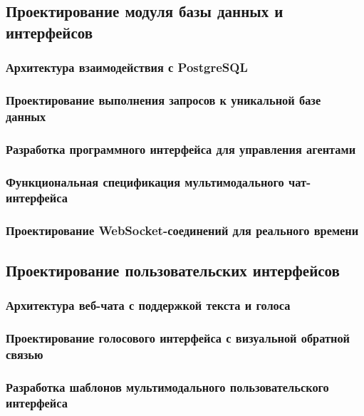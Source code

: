 \documentclass{syksu-coursework}
\begin{document}
\subsection{Проектирование модуля базы данных и интерфейсов}

\subsubsection{Архитектура взаимодействия с PostgreSQL}

\subsubsection{Проектирование выполнения запросов к уникальной базе данных}

\subsubsection{Разработка программного интерфейса для управления агентами}

\subsubsection{Функциональная спецификация мультимодального чат-интерфейса}

\subsubsection{Проектирование WebSocket-соединений для реального времени}

\subsection{Проектирование пользовательских интерфейсов}

\subsubsection{Архитектура веб-чата с поддержкой текста и голоса}

\subsubsection{Проектирование голосового интерфейса с визуальной обратной связью}

\subsubsection{Разработка шаблонов мультимодального пользовательского интерфейса}
\end{document}
